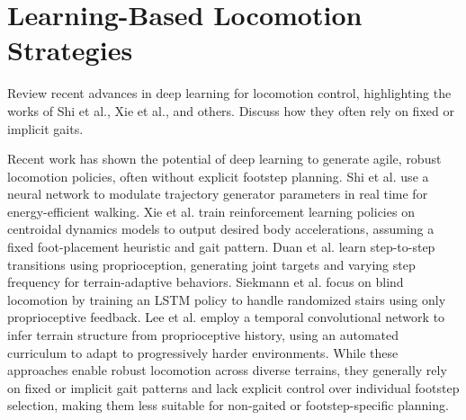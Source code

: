 \section{Learning-Based Locomotion Strategies}

\begin{outline}
  Review recent advances in deep learning for locomotion control, highlighting the works of Shi et al., Xie et al., and others. Discuss how they often rely on fixed or implicit gaits.
\end{outline}

Recent work has shown the potential of deep learning to generate agile, robust locomotion policies, often without explicit footstep planning. Shi et al. \cite{shi_terrain-aware_2023} use a neural network to modulate trajectory generator parameters in real time for energy-efficient walking. Xie et al. \cite{xie_glide_2023} train reinforcement learning policies on centroidal dynamics models to output desired body accelerations, assuming a fixed foot-placement heuristic and gait pattern. Duan et al. \cite{duan_sim--real_2022} learn step-to-step transitions using proprioception, generating joint targets and varying step frequency for terrain-adaptive behaviors. Siekmann et al. \cite{siekmann_blind_2021} focus on blind locomotion by training an LSTM policy to handle randomized stairs using only proprioceptive feedback. Lee et al. \cite{lee_learning_2020} employ a temporal convolutional network to infer terrain structure from proprioceptive history, using an automated curriculum to adapt to progressively harder environments. While these approaches enable robust locomotion across diverse terrains, they generally rely on fixed or implicit gait patterns and lack explicit control over individual footstep selection, making them less suitable for non-gaited or footstep-specific planning.
